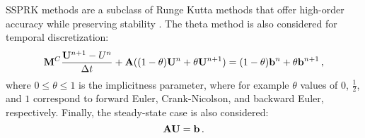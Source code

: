 SSPRK methods are a subclass of Runge Kutta methods that offer high-order
accuracy while preserving stability \cite{gottlieb}\cite{macdonald}.
The theta method is also considered for temporal discretization:
\begin{equation}
  \mathbf{M}^C\frac{\mathbf{U}^{n+1}-U^n}{\Delta t} + \mathbf{A}((1-\theta)\mathbf{U}^n + \theta\mathbf{U}^{n+1})
  = (1-\theta)\mathbf{b}^n + \theta\mathbf{b}^{n+1} \,,
\end{equation}
where $0\leq\theta\leq 1$ is the implicitness parameter, where for example
$\theta$ values of $0$, $\frac{1}{2}$, and $1$ correspond to forward Euler,
Crank-Nicolson, and backward Euler, respectively. Finally, the steady-state
case is also considered:
\begin{equation}
  \mathbf{A}\mathbf{U} = \mathbf{b} \,.
\end{equation}
